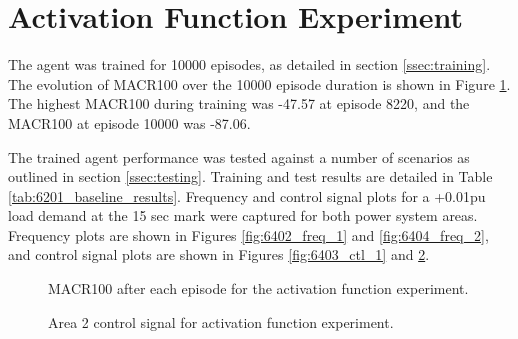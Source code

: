 \section{Activation Function Experiment}
The agent was trained for 10000 episodes, as detailed in section \ref{ssec:training}. The evolution of MACR100 over the 10000 episode duration is shown in Figure \ref{fig:6401_average_reward}. The highest MACR100 during training was -47.57 at episode 8220, and the MACR100 at episode 10000 was -87.06.

The trained agent performance was tested against a number of scenarios as outlined in section \ref{ssec:testing}. Training and test results are detailed in Table \ref{tab:6201_baseline_results}. Frequency and control signal plots for a +0.01pu load demand at the 15 sec mark were captured for both power system areas. Frequency plots are shown in Figures \ref{fig:6402_freq_1} and \ref{fig:6404_freq_2}, and control signal plots are shown in Figures \ref{fig:6403_ctl_1} and \ref{fig:6405_ctl_2}.

\begin{figure}[h]
	\centering
	
	\caption{MACR100 after each episode for the activation function experiment.}\label{fig:6401_average_reward}
\end{figure}



\begin{figure}[h]
	\centering
	
	
	\vspace{-0.5cm}
	\caption{Area 1 frequency response for activation function experiment.}\label{fig:6402_freq_1}
	
	\vspace{0.5cm}
	
	
	\vspace{-0.5cm}
	\caption{Area 1 control signal for activation function experiment.}\label{fig:6403_ctl_1}
	
	\vspace{0.5cm}
	
	
	\vspace{-0.5cm}
	\caption{Area 2 frequency response for activation function experiment.}\label{fig:6404_freq_2}
	
	\vspace{0.5cm}
		
	
	\vspace{-0.5cm}
	\caption{Area 2 control signal for activation function experiment.}\label{fig:6405_ctl_2}
\end{figure}